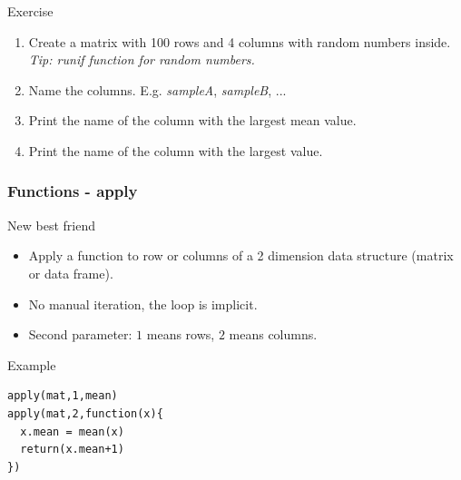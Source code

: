 \documentclass[10pt]{beamer}
\newenvironment{xframe}[2][]
  {\begin{frame}[fragile,environment=xframe,#1]
  \frametitle{#2}}
  {\end{frame}}
\begin{document}

\begin{frame}{Exercise}
  \begin{enumerate}
  \item Create a matrix with 100 rows and 4 columns with random numbers inside. {\scriptsize\it Tip: {\sf runif} function for random numbers.}
  \item Name the columns. E.g. {\it sampleA}, {\it sampleB}, ...
  \item Print the name of the column with the largest mean value.
  \item Print the name of the column with the largest value.
  \end{enumerate}
\end{frame}


\begin{xframe}{Functions - {\sf apply}}
  \begin{block}{New best friend}
    \begin{itemize}
    \item Apply a function to row or columns of a 2 dimension data structure (matrix or data frame).
    \item No manual iteration, the loop is implicit.
    \item Second parameter: $1$ means rows, $2$ means columns.
    \end{itemize}
  \end{block}
  \begin{exampleblock}{Example}
\begin{verbatim}
apply(mat,1,mean)
apply(mat,2,function(x){
  x.mean = mean(x)
  return(x.mean+1)
})
\end{verbatim}  
  \end{exampleblock}
\end{xframe}

\end{document}

